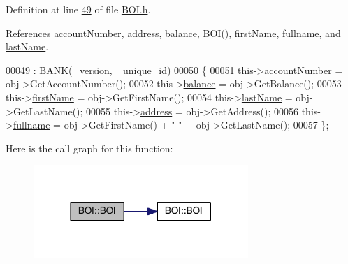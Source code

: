 Definition at line \hyperlink{_b_o_i_8h_source_l00049}{49} of file \hyperlink{_b_o_i_8h_source}{B\+O\+I.\+h}.



References \hyperlink{_b_o_i_8h_source_l00099}{account\+Number}, \hyperlink{_b_o_i_8h_source_l00101}{address}, \hyperlink{_b_o_i_8h_source_l00100}{balance}, \hyperlink{_b_o_i_8h_source_l00024}{B\+O\+I()}, \hyperlink{_b_o_i_8h_source_l00097}{first\+Name}, \hyperlink{_b_o_i_8h_source_l00096}{fullname}, and \hyperlink{_b_o_i_8h_source_l00098}{last\+Name}.


\begin{DoxyCode}
00049                                                              : \hyperlink{class_b_a_n_k_a0bc938356cebff14fb0560264abe5a34_a0bc938356cebff14fb0560264abe5a34}{BANK}(\_version, \_unique\_id)
00050     \{
00051         this->\hyperlink{class_b_o_i_a35c9fd6e938eb44ad4e076bc6a736851_a35c9fd6e938eb44ad4e076bc6a736851}{accountNumber} = obj->GetAccountNumber();
00052         this->\hyperlink{class_b_o_i_aa00a3d8baf3420647c40119b7fa4ed6f_aa00a3d8baf3420647c40119b7fa4ed6f}{balance} = obj->GetBalance();
00053         this->\hyperlink{class_b_o_i_a12872fd8c15dbf833f78862b00579ed1_a12872fd8c15dbf833f78862b00579ed1}{firstName} = obj->GetFirstName();
00054         this->\hyperlink{class_b_o_i_ad51bfa6f28816c7f5036447ff809cecf_ad51bfa6f28816c7f5036447ff809cecf}{lastName} = obj->GetLastName();
00055         this->\hyperlink{class_b_o_i_ab9315fe76fd9f07551f5ae7899d33516_ab9315fe76fd9f07551f5ae7899d33516}{address} = obj->GetAddress();
00056         this->\hyperlink{class_b_o_i_a6d7c892a54bb6f7327cdc777081ab5f4_a6d7c892a54bb6f7327cdc777081ab5f4}{fullname} = obj->GetFirstName() + \textcolor{stringliteral}{" "} + obj->GetLastName(); 
00057     \};
\end{DoxyCode}


Here is the call graph for this function\+:\nopagebreak
\begin{figure}[H]
\begin{center}
\leavevmode
\includegraphics[width=230pt]{class_b_o_i_ae4263940f8ffdd40d5f01a714b20f791_ae4263940f8ffdd40d5f01a714b20f791_cgraph}
\end{center}
\end{figure}


